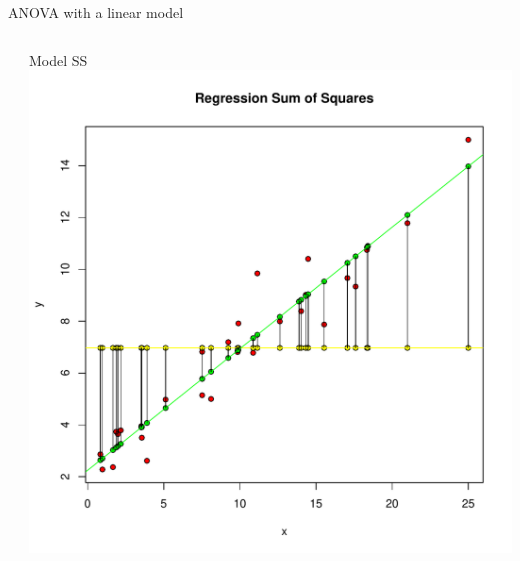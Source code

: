 \documentclass[aspectratio=169]{beamer}\usepackage[]{graphicx}\usepackage[]{color}
\makeatletter
\def\maxwidth{ %
  \ifdim\Gin@nat@width>\linewidth
    \linewidth
  \else
    \Gin@nat@width
  \fi
}
\newenvironment{knitrout}{}{} %
\makeatother
\begin{document}
\begin{frame}[fragile]{ANOVA with a linear model}
\begin{columns}
\begin{column}{0.33\textwidth}
\begin{knitrout}
\end{knitrout}
\end{column}
	\begin{column}{0.33\textwidth}
		Model SS
\begin{knitrout}\scriptsize
{}\color{fgcolor}
\includegraphics[width=\maxwidth]{figure/unnamed-chunk-10-1} 

\end{knitrout}
	\end{column}
\end{columns}
\end{frame}
\end{document}
